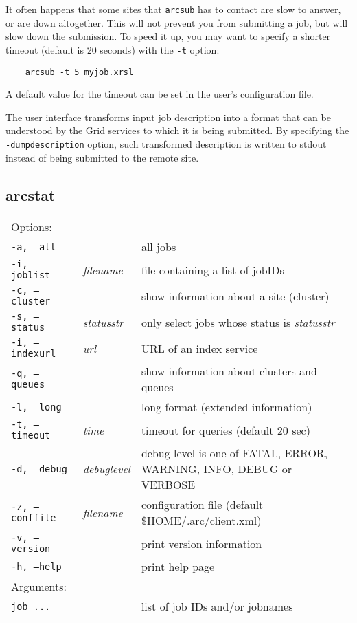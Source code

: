 It often happens that some sites that \verb#arcsub# has to contact
are slow to answer, or are down altogether. This will not prevent
you from submitting a job, but will slow down the submission. To
speed it up, you may want to specify a shorter timeout (default is
20 seconds) with the \verb#-t# option:
\begin{verbatim}
    arcsub -t 5 myjob.xrsl
\end{verbatim}

A default value for the timeout can be set in the user's configuration file.

The user interface transforms input job description into a format
that can be understood by the Grid services to which it is being
submitted. By specifying the \verb#-dumpdescription# option, such transformed
description is written to stdout instead of being submitted to the remote site.




\subsection{arcstat}
\label{sec:arcstat}

\begin{shaded}
\end{shaded}
\begin{longtable}{llp{8cm}}
   Options:&&\\
   \texttt{-a, --all}& & all jobs\\
   \texttt{-i, --joblist}& \textit{filename}& file containing a list of jobIDs\\
   \texttt{-c, --cluster}& & show information about a site (cluster)\\
   \texttt{-s, --status}& \textit{statusstr} &only select jobs whose status is \textit{statusstr}\\
   \texttt{-i, --indexurl}& \textit{url} &URL of an index service\\
   \texttt{-q, --queues}&&show information about clusters and queues\\
   \texttt{-l, --long}& & long format (extended information)\\
   \texttt{-t, --timeout}& \textit{time}& timeout for queries (default 20 sec)\\
   \texttt{-d, --debug}& \textit{debuglevel}&debug level is one of  FATAL, ERROR, WARNING, INFO, DEBUG or VERBOSE\\
   \texttt{-z, --conffile}&\textit{filename}& configuration file (default {\$}HOME/.arc/client.xml)\\
   \texttt{-v, --version}& & print version information\\
   \texttt{-h, --help}& & print help page\\
   Arguments:&&\\
   \texttt{job ...} && list of job IDs and/or jobnames\\
\end{longtable}

